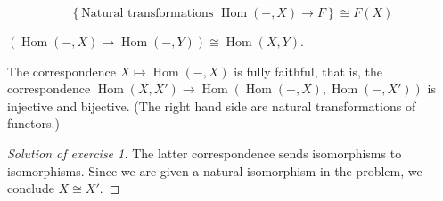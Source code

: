 \documentclass{article}
\DeclareMathOperator{\Hom}{Hom}
\begin{document}
\begin{lemma}[Yoneda]	
	\[\left\{\text{Natural transformations }\Hom(-,X)\to F\right\}\cong F(X)\]
\end{lemma}
\begin{coro}
	$(\Hom(-,X)\to\Hom(-,Y))\cong\Hom(X,Y)$.
\end{coro}
\begin{coro}
	The correspondence $X\mapsto\Hom(-,X)$ is fully faithful, that is, the correspondence $\Hom(X,X')\to\Hom(\Hom(-,X),\Hom(-,X'))$ is injective and bijective. (The right hand side are natural transformations of functors.)
\end{coro}
\begin{proof}[Solution of exercise 1] The latter correspondence sends isomorphisms to isomorphisms. Since we are given a natural isomorphism in the problem, we conclude $X\cong X'$.
\end{proof}
\end{document}
